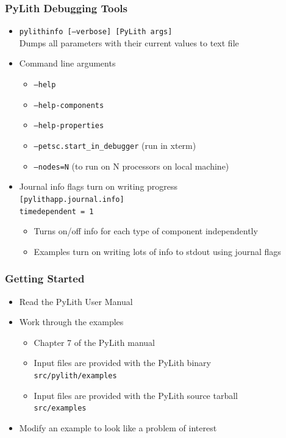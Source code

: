 \documentclass{beamer}
\begin{document}
\begin{frame}
  \frametitle{PyLith Debugging Tools}
  \summary{}

  \begin{itemize}
  \item {\tt pylithinfo [--verbose] [PyLith args]}\\
    Dumps all parameters with their current values to text file
  \item Command line arguments
    \begin{itemize}
    \item {\tt --help}
    \item {\tt --help-components}
    \item {\tt --help-properties}
    \item {\tt --petsc.start\_in\_debugger} (run in xterm)
    \item {\tt --nodes=N} (to run on N processors on local machine)
    \end{itemize}
  \item Journal info flags turn on writing progress\\
    {\tt [pylithapp.journal.info]}\\
    {\tt timedependent = 1} \\
    \begin{itemize}
    \item Turns on/off info for each type of component independently
    \item Examples turn on writing lots of info to stdout using journal flags
    \end{itemize}
  \end{itemize}

\end{frame}


\begin{frame}
  \frametitle{Getting Started}
  \summary{}

  \begin{itemize}
  \item Read the PyLith User Manual
  \item Work through the examples
    \begin{itemize}
    \item Chapter 7 of the PyLith manual
    \item Input files are provided with the PyLith binary\\
      {\tt src/pylith/examples}
    \item Input files are provided with the PyLith source tarball\\
      {\tt src/examples}
    \end{itemize}
  \item Modify an example to look like a problem of interest
  \end{itemize}

\end{frame}


\end{document}
